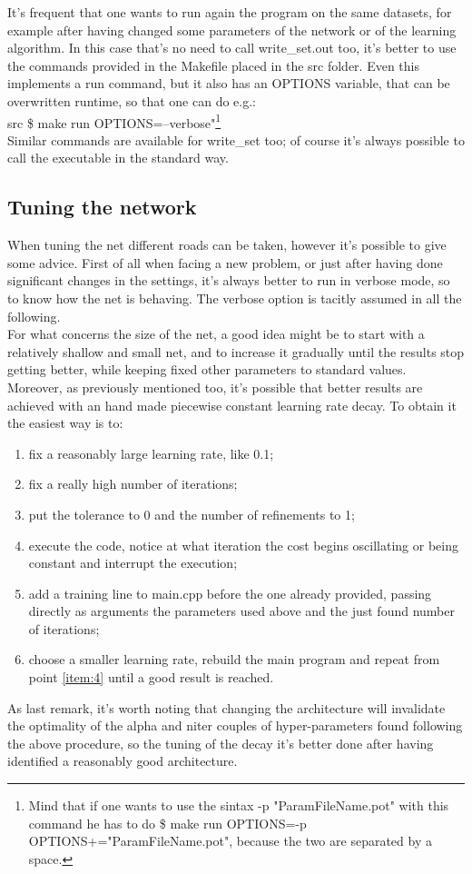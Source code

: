 \documentclass[12pt, a4paper]{report}
\theoremstyle{definition}
\begin{document}
\noindent It's frequent that one wants to run again the program on the same datasets, for example after having changed some parameters of the network or of the learning algorithm. In this case that's no need to call write\_set.out too, it's better to use the commands provided in the Makefile placed in the src folder. Even this implements a run command, but it also has an {\ttfamily OPTIONS} variable, that can be overwritten runtime, so that one can do e.g.:\\
{\ttfamily src \$ make run OPTIONS=--verbose"}\footnote{Mind that if one wants to use the sintax {\ttfamily -p "ParamFileName.pot"} with this command he has to do {\ttfamily \$ make run OPTIONS=-p OPTIONS+="ParamFileName.pot"}, because the two are separated by a space.}\\
Similar commands are available for write\_set too; of course it's always possible to call the executable in the standard way.
\subsection{Tuning the network}
When tuning the net different roads can be taken, however it's possible to give some advice. First of all when facing a new problem, or just after having done significant changes in the settings, it's always better to run in verbose mode, so to know how the net is behaving. The verbose option is tacitly assumed in all the following.\\
For what concerns the size of the net, a good idea might be to start with a relatively shallow and small net, and to increase it gradually until the results stop getting better, while keeping fixed other parameters to standard values.\\
Moreover, as previously mentioned too, it's possible that better results are achieved with an hand made piecewise constant learning rate decay. To obtain it the easiest way is to:
\begin{enumerate}
	\item\label{item:1} fix a reasonably large learning rate, like 0.1;
	\item fix a really high number of iterations;
	\item put the tolerance to 0 and the number of refinements to 1;
	\item\label{item:4} execute the code, notice at what iteration the cost begins oscillating or being constant and interrupt the execution;
	\item add a training line to main.cpp before the one already provided, passing directly as arguments the parameters used above and the just found number of iterations;
	\item choose a smaller learning rate, rebuild the main program and repeat from point \ref{item:4} until a good result is reached.
\end{enumerate}
As last remark, it's worth noting that changing the architecture will invalidate the optimality of the {\ttfamily alpha} and {\ttfamily niter} couples of hyper-parameters found following the above procedure, so the tuning of the decay it's better done after having identified a reasonably good architecture.
\end{document}
